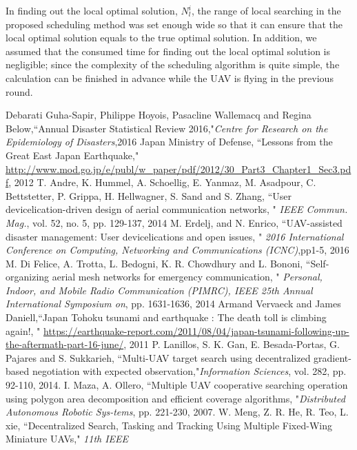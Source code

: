 \documentclass{ieeeaccess}
\begin{document}
In finding out the local optimal solution, $N_{l}^i$, the range of local searching in the proposed scheduling method was set enough wide so that it can ensure that the local optimal solution equals to the true optimal solution.
%
In addition, we assumed that the consumed time for finding out the local optimal solution is negligible; since the complexity of the scheduling algorithm is quite simple, the calculation can be finished in advance while the UAV is flying in the previous round.

\ifCLASSOPTIONcaptionsoff
  \newpage
\fi

\begin{thebibliography}{1}
Debarati Guha-Sapir, Philippe Hoyois, Pasacline Wallemacq and Regina Below,``Annual Disaster Statistical Review 2016,"\emph{Centre for Research on
the Epidemiology of Disasters},2016 
 Japan Ministry of Defense, ``Lessons from the Great East Japan Earthquake," \url{http://www.mod.go.jp/e/publ/w_paper/pdf/2012/30_Part3_Chapter1_Sec3.pdf}, 2012
 T. Andre, K. Hummel, A. Schoellig, E. Yanmaz, M. Asadpour, C. Bettstetter, P. Grippa, H. Hellwagner, S. Sand and S. Zhang, ``User devicelication-driven design of aerial communication networks, " \emph{IEEE Commun. Mag.}, vol. 52, no. 5, pp. 129-137, 2014
 M. Erdelj, and N. Enrico, ``UAV-assisted disaster management: User devicelications and open issues, " \emph{2016 International Conference on Computing, Networking and Communications (ICNC)},pp1-5, 2016
 M. Di Felice, A. Trotta, L. Bedogni, K. R. Chowdhury and L. Bononi, ``Self-organizing aerial mesh networks for emergency communication, " \emph{Personal, Indoor, and Mobile Radio Communication (PIMRC), IEEE 25th Annual International Symposium on}, pp. 1631-1636, 2014
Armand Vervaeck and James Daniell,``Japan Tohoku tsunami and earthquake : The death toll is climbing again!, " \url{https://earthquake-report.com/2011/08/04/japan-tsunami-following-up-the-aftermath-part-16-june/}, 2011
 P. Lanillos, S. K. Gan, E. Besada-Portas, G. Pajares and S. Sukkarieh, ``Multi-UAV target search using decentralized gradient-based negotiation with expected observation,"\emph{Information Sciences}, vol. 282, pp. 92-110, 2014.
 I. Maza, A. Ollero, ``Multiple UAV cooperative searching operation
using polygon area decomposition and efficient coverage algorithms, "\emph{Distributed Autonomous Robotic Sys-tems}, pp. 221-230, 2007.
 W. Meng, Z. R. He, R. Teo, L. xie, ``Decentralized Search, Tasking and Tracking Using Multiple Fixed-Wing Miniature UAVs," \emph{11th IEEE
}
\end{thebibliography}
\end{document}
